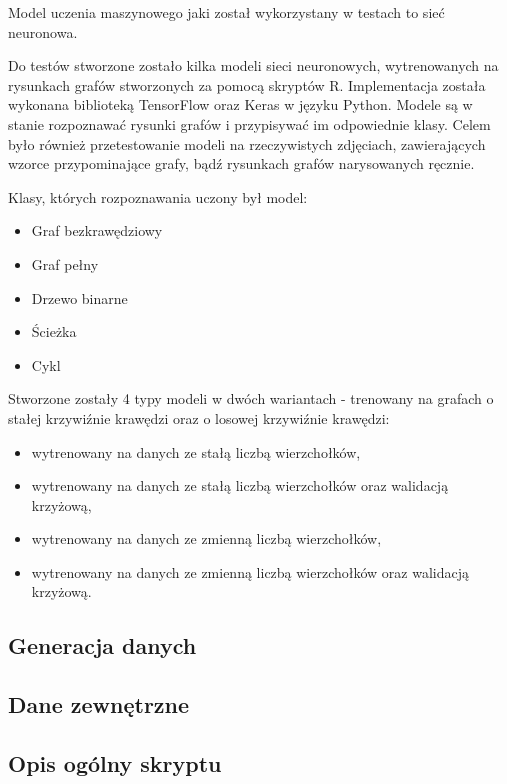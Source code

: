 Model uczenia maszynowego jaki został wykorzystany w testach to sieć neuronowa.

Do testów stworzone zostało kilka modeli sieci neuronowych,
wytrenowanych na rysunkach grafów stworzonych za pomocą skryptów R.
Implementacja została wykonana biblioteką TensorFlow oraz Keras w języku Python.
Modele są w stanie rozpoznawać rysunki grafów i przypisywać im odpowiednie klasy.
Celem było również przetestowanie modeli na rzeczywistych zdjęciach,
zawierających wzorce przypominające grafy, bądź rysunkach grafów narysowanych ręcznie.

Klasy, których rozpoznawania uczony był model:
\begin{itemize}[label=-,labelsep=0.4cm,leftmargin=0.6cm]
	\item Graf bezkrawędziowy
	\item Graf pełny
	\item Drzewo binarne
	\item Ścieżka
	\item Cykl
\end{itemize}

Stworzone zostały 4 typy modeli w dwóch wariantach - trenowany na grafach o stałej krzywiźnie krawędzi oraz o losowej krzywiźnie krawędzi:
\begin{itemize}[label=-,labelsep=0.4cm,leftmargin=0.6cm]
	\item wytrenowany na danych ze stałą liczbą wierzchołków,
	\item wytrenowany na danych ze stałą liczbą wierzchołków oraz walidacją krzyżową,
	\item wytrenowany na danych ze zmienną liczbą wierzchołków,
	\item wytrenowany na danych ze zmienną liczbą wierzchołków oraz walidacją krzyżową.
\end{itemize}

\subsection{Generacja danych}


\subsection{Dane zewnętrzne}


\subsection{Opis ogólny skryptu}
